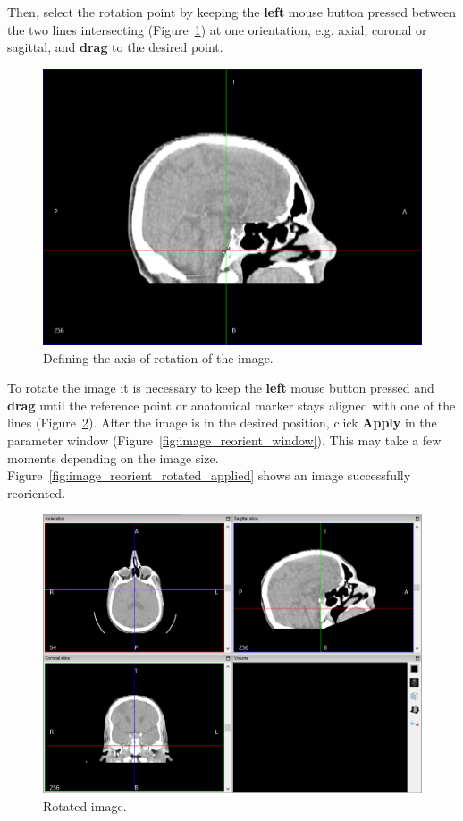 Then, select the rotation point by keeping the \textbf{left} mouse button pressed between the two lines intersecting (Figure~\ref{fig:image_reorient_adjust_center}) at one orientation, e.g. axial, coronal or sagittal, and \textbf{drag} to the desired point.

\begin{figure}[!htb]
\centering
\includegraphics[scale=0.4]{../user_guide_figures/invesalius_screen/image_reorient_adjust_center_en.png}
\caption{Defining the axis of rotation of the image.}
\label{fig:image_reorient_adjust_center}
\end{figure}

To rotate the image it is necessary to keep the \textbf{left} mouse button pressed and \textbf{drag} until the reference point or anatomical marker stays aligned with one of the lines (Figure~\ref{fig:image_reorient_rotated}). After the image is in the desired position, click \textbf{Apply} in the parameter window (Figure~\ref{fig:image_reorient_window}). This may take a few moments depending on the image size. Figure~\ref{fig:image_reorient_rotated_applied} shows an image successfully reoriented.

\begin{figure}[!htb]
\centering
\includegraphics[scale=0.4]{../user_guide_figures/invesalius_screen/image_reorient_rotated_en.png}
\caption{Rotated image.}
\label{fig:image_reorient_rotated}
\end{figure}

